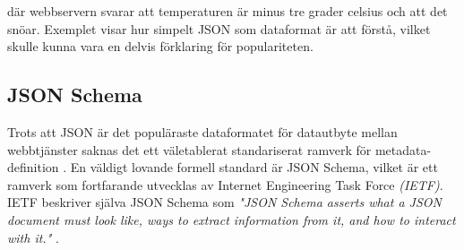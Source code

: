 \documentclass[swedish]{kththesis}
\begin{document}
\noindent
där webbservern svarar att temperaturen är minus tre grader celsius och att det snöar. Exemplet visar hur simpelt JSON som dataformat är att förstå, vilket skulle kunna vara en delvis förklaring för populariteten.





\subsection{JSON Schema}
Trots att JSON är det populäraste dataformatet för datautbyte mellan webbtjänster saknas det ett väletablerat standariserat ramverk för metadata-definition \cite{Pezoa2016}. En väldigt lovande formell standard är JSON Schema, vilket är ett ramverk som fortfarande utvecklas av Internet Engineering Task Force \textit{(IETF)}. IETF beskriver själva JSON Schema som \textit{"JSON Schema asserts what a JSON document must look like, ways to extract information from it, and how to interact with it."} \cite{A.Wright}.
\end{document}
